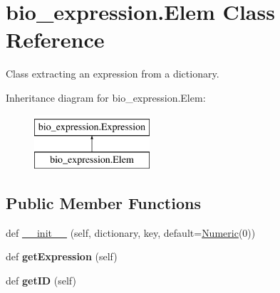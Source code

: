 \hypertarget{classbio__expression_1_1_elem}{}\section{bio\+\_\+expression.\+Elem Class Reference}
\label{classbio__expression_1_1_elem}


Class extracting an expression from a dictionary.  


Inheritance diagram for bio\+\_\+expression.\+Elem\+:\begin{figure}[H]
\begin{center}
\leavevmode
\includegraphics[height=2.000000cm]{classbio__expression_1_1_elem}
\end{center}
\end{figure}
\subsection*{Public Member Functions}
\begin{DoxyCompactItemize}
\item 
def \hyperlink{classbio__expression_1_1_elem_a2011b697f2308ae92b9028915bcf7a8b}{\+\_\+\+\_\+init\+\_\+\+\_\+} (self, dictionary, key, default=\hyperlink{classbio__expression_1_1_numeric}{Numeric}(0))
\item 
def {\bfseries get\+Expression} (self)\hypertarget{classbio__expression_1_1_elem_a96df9f74810ff7621426dfb884539c3f}{}\label{classbio__expression_1_1_elem_a96df9f74810ff7621426dfb884539c3f}

\item 
def {\bfseries get\+ID} (self)\hypertarget{classbio__expression_1_1_elem_a2ef3c4c71329ff164aa61b3bb83444ee}{}\label{classbio__expression_1_1_elem_a2ef3c4c71329ff164aa61b3bb83444ee}

\end{DoxyCompactItemize}
